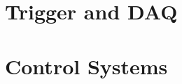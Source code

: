 \section{Trigger and DAQ}
\section{Control Systems}

\begin{comment}



\subsubsection{Time-of-Flight System}\label{sec:TOF}

The LArIAT time-of-flight (TOF) detector system consists broadly consists of two scintillator paddles, which bracket the beamline and are shown in blue in Figure~\ref{fig:tert-layout}. The exact details of the of the TOF system were changed between Run-II and Run-III to allow for better performance and timing resolution.

\paragraph{\textbf{TOF System for Run-I and Run-II:}}
The upstream paddle, shown in Figure \ref{}, has a relatively small active area (10~cm x 6~cm ) and was chosen to be a relatively thin piece of scintillator to minimize any impact on the momentum of the particles coming from the target. Light guides were mounted on all four edges which lead to two \textit{insert PMT type} PMTs mounted on the beam left side. The downstream paddle, shown in Figure \ref{fig:TOFSystemRunIandII}, was chosen to have a slightly larger area (14~cm x 14~cm) and had two \textit{insert PMT type} PMTs which were read out on opposite ends of the paddle.

\begin{figure}[!h]
\begin{centering}
\vspace{-0.3cm}
\caption{
{\scriptsize \sf Pictures of the TOF system as was deployed during Run-I and Run-II data taking. The left image is of the upstream TOF paddle and the right image is of the downstream TOF paddle }
}
\label{fig:TOFSystemRunIandII}
\end{centering}
\end{figure}


\end{comment}
